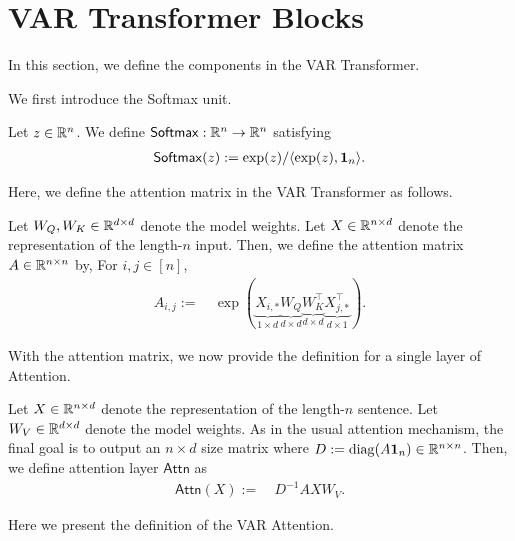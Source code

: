 
\section{VAR Transformer Blocks}\label{sec:app_var}

In this section, we define the components in the VAR Transformer.

We first introduce the Softmax unit.

\begin{definition}[Softmax] \label{def:softmax}
    Let $z \in \mathbb{R}^{n}$. We define 
    $\mathsf{Softmax}: \mathbb{R}^{n} \to \mathbb{R}^{n}$ satisfying 
    \begin{align*}
        \mathsf{Softmax}(z):= \exp(z) / \langle \exp(z) , {\bf 1}_n \rangle.  
    \end{align*}
\end{definition}

Here, we define the attention matrix in the VAR Transformer as follows.

\begin{definition}\label{def:attn_matrix}
    Let $W_Q, W_K \in \mathbb{R}^{d \times d}$ denote the model weights. Let $X \in \mathbb{R}^{n \times d}$ denote the representation of the length-$n$ input. Then, we define the attention matrix $A \in \mathbb{R}^{n \times n}$ by, For $i,j \in [n]$, 
    \begin{align*}
        A_{i,j} := & ~\exp( \underbrace{ X_{i,*} }_{1 \times d} \underbrace{ W_Q }_{d \times d} \underbrace{ W_K^\top }_{d \times d} \underbrace{ X_{j,*}^\top }_{d \times 1}).
    \end{align*}
\end{definition}

With the attention matrix, we now provide the definition for a single layer of Attention.

\begin{definition}\label{def:single_layer_transformer}
     Let $X \in \mathbb{R}^{n \times d}$ denote the representation of the length-$n$ sentence. Let $W_V \in \mathbb{R}^{d \times d}$ denote the model weights. As in the usual attention mechanism, the final goal is to output an $n \times d$ size matrix where $D:= \operatorname{diag}( A {\bf 1}_n) \in \mathbb{R}^{n \times n}$. Then, we define attention layer $\mathsf{Attn}$ as
    \begin{align*}
        \mathsf{Attn} (X) := & ~ D^{-1} A X W_V .
    \end{align*}
\end{definition}

Here we present the definition of the VAR Attention.


